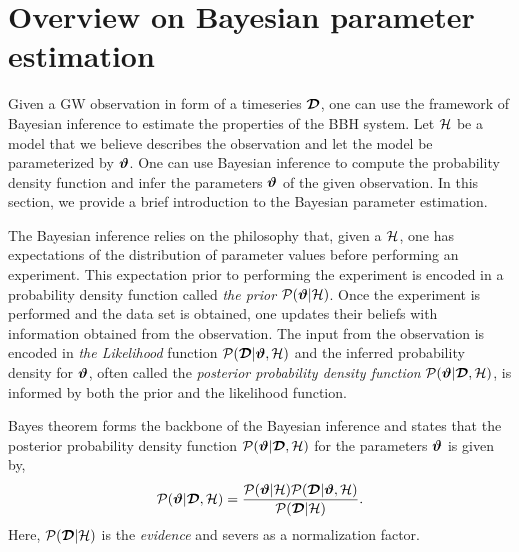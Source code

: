 \section{Overview on Bayesian parameter estimation}

Given a GW observation in form of a timeseries $\boldsymbol{\mathcal{D}}$, one can use the framework of Bayesian inference to estimate the properties of the BBH system. Let $\mathcal{H}$ be a model that we believe describes the observation and let the model be parameterized by  $\boldsymbol{\vartheta}$. One can use Bayesian inference to compute the probability density function and infer the parameters $\boldsymbol{\vartheta}$ of the given observation. In this section, we provide a brief introduction to the Bayesian parameter estimation. 

The Bayesian inference relies on the philosophy that, given a $\mathcal{H}$, one has expectations of the distribution of parameter values before performing an experiment. This expectation prior to performing the experiment is encoded in a probability density function called \textit{the prior}  $\mathcal{P}(\boldsymbol{\vartheta}|\mathcal{H})$. Once the experiment is performed and the data set is obtained, one updates their beliefs with information obtained from the observation. The input from the observation is encoded in \textit{the Likelihood }function $\mathcal{P}(\boldsymbol{\mathcal{D}}|\boldsymbol{\vartheta},\mathcal{H})$ and the inferred probability density for $\boldsymbol{\vartheta}$, often called the \textit{posterior probability density function} $\mathcal{P}(\boldsymbol{\vartheta}|\boldsymbol{\mathcal{D}},\mathcal{H})$, is informed by both the prior and the likelihood function.




Bayes theorem forms the backbone of the Bayesian inference and states that the posterior probability density function $\mathcal{P}(\boldsymbol{\vartheta}|\boldsymbol{\mathcal{D}},\mathcal{H})$ for the parameters $\boldsymbol{\vartheta}$ is given by, 
\begin{align}
\label{eq:bayes_thrm}
\mathcal{P}(\boldsymbol{\vartheta}|\boldsymbol{\mathcal{D}},\mathcal{H}) = \frac{\mathcal{P}(\boldsymbol{\vartheta}|\mathcal{H}) \mathcal{P}(\boldsymbol{\mathcal{D}}|\boldsymbol{\vartheta},\mathcal{H})}{\mathcal{P}(\boldsymbol{\mathcal{D}}|\mathcal{H})}.
\end{align}
Here, $\mathcal{P}(\boldsymbol{\mathcal{D}}|\mathcal{H})$ is the \textit{evidence} and severs as a normalization factor. 

